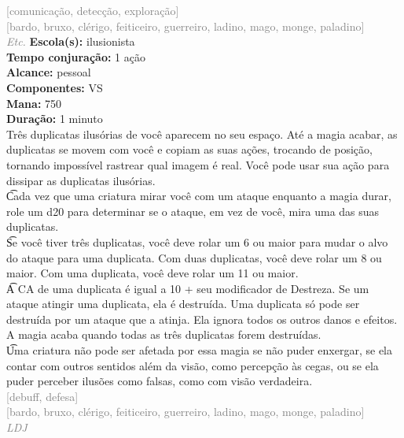 \documentclass{RPG_Adventure}[2021/10/20]
\begin{document}
{\scriptsize \textcolor{gray}{[comunicação, detecção, exploração]\\}}
{\scriptsize \textcolor{gray}{[bardo, bruxo, clérigo, feiticeiro, guerreiro, ladino, mago, monge, paladino]\\}}
{\tiny \textcolor{gray}{\textit{Etc.}}}
{\small \t \textbf{Escola(s):} ilusionista\\\t \textbf{Tempo conjuração:} 1 ação\\\t \textbf{Alcance:} pessoal\\\t \textbf{Componentes:} VS\\\t \textbf{Mana:} 750\\\t \textbf{Duração:} 1 minuto\\}
{\normalsize Três duplicatas ilusórias de você aparecem no seu espaço.  Até a magia acabar, as duplicatas se movem com você e copiam as suas ações, trocando de posição, tornando impossível rastrear qual imagem é real. Você pode usar sua ação para dissipar as duplicatas ilusórias.\\\t Cada vez que uma criatura mirar você com um ataque enquanto a magia durar, role um d20 para determinar se o ataque, em vez de você, mira uma das suas duplicatas.\\\t Se você tiver três duplicatas, você deve rolar um 6 ou maior para mudar o alvo do ataque para uma duplicata.  Com duas duplicatas, você deve rolar um 8 ou maior. Com uma duplicata, você deve rolar um 11 ou maior.\\\t A CA de uma duplicata é igual a 10 + seu modificador de Destreza. Se um ataque atingir uma duplicata, ela é destruída. Uma duplicata só pode ser destruída por um ataque que a atinja. Ela ignora todos os outros danos e efeitos. A magia acaba quando todas as três duplicatas forem destruídas.\\\t Uma criatura não pode ser afetada por essa magia se não puder enxergar, se ela contar com outros sentidos além da visão, como percepção às cegas, ou se ela puder perceber ilusões como falsas, como com visão verdadeira.\\}
{\scriptsize \textcolor{gray}{[debuff, defesa]\\}}
{\scriptsize \textcolor{gray}{[bardo, bruxo, clérigo, feiticeiro, guerreiro, ladino, mago, monge, paladino]\\}}
{\tiny \textcolor{gray}{\textit{LDJ}}}
\end{document}
